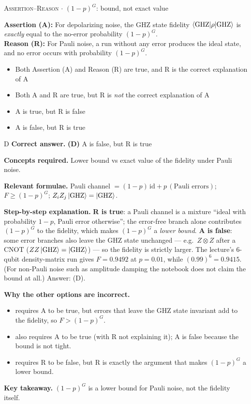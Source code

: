 \documentclass[11pt,a4paper]{article}
\newcommand{\optlabel}[1]{\textbf{(#1)}}
\newcommand{\correctlabel}[1]{\textcolor{okgreen}{\textbf{(#1)}\,\ding{51}}}
\newenvironment{qitem}[1]{\begin{list}{}{\setlength{\leftmargin}{3.3em}\setlength{\labelwidth}{3.1em}%
  \setlength{\labelsep}{0.2em}\setlength{\topsep}{3pt}\setlength{\parsep}{3pt}}\item[\textbf{Q.#1}\hfill]}{\end{list}}
\newcommand{\qsep}{\par\vspace{2pt}{\color{black!15}\hrule}\vspace{4pt}}
\newcommand{\qmeta}[2]{{\footnotesize\color{black!60}\textsc{#1} \;$\cdot$\; #2}\par}
\begin{document}
\begin{qitem}{57}
\qmeta{Assertion--Reason}{$(1-p)^G$: bound, not exact value}
\textbf{Assertion (A):} For depolarizing noise, the GHZ state fidelity $\braket{\mathrm{GHZ}|\rho|\mathrm{GHZ}}$ is \emph{exactly} equal to the
no-error probability $(1 - p)^G$.\\[1mm]
\textbf{Reason (R):} For Pauli noise, a run without any error produces the ideal state, and no error occurs with probability $(1 - p)^G$.
\begin{itemize}[leftmargin=2.6em, labelsep=0.4em, itemsep=2pt, topsep=3pt]
\item[\optlabel{A}] Both Assertion (A) and Reason (R) are true, and R is the correct explanation of A
\item[\optlabel{B}] Both A and R are true, but R is \emph{not} the correct explanation of A
\item[\optlabel{C}] A is true, but R is false
\item[\correctlabel{D}] A is false, but R is true
\end{itemize}
\end{qitem}
\begin{solbox}{D}
\textbf{\color{brand}Correct answer.} \textcolor{okgreen}{\textbf{(D)}} A is false, but R is true

\textbf{\color{brand}Concepts required.} Lower bound vs exact value of the fidelity under Pauli noise.

\textbf{\color{brand}Relevant formulae.} Pauli channel $= (1-p)\,\mathrm{id} + p\,(\text{Pauli errors})$; $F \ge (1-p)^G$; $Z_iZ_j\ket{\mathrm{GHZ}} = \ket{\mathrm{GHZ}}$.

\textbf{\color{brand}Step-by-step explanation.} \textbf{R is true}: a Pauli channel is a mixture ``ideal with probability $1 - p$, Pauli error otherwise''; the error-free branch alone contributes
$(1-p)^G$ to the fidelity, which makes $(1-p)^G$ a \emph{lower bound}. \textbf{A is false}: some error branches also leave the GHZ state unchanged ---
e.g.\ $Z\otimes Z$ after a CNOT ($ZZ\ket{\mathrm{GHZ}} = \ket{\mathrm{GHZ}}$) --- so the fidelity is strictly larger. The lecture's 6-qubit density-matrix run gives
$F = 0.9492$ at $p = 0.01$, while $(0.99)^6 = 0.9415$. (For non-Pauli noise such as amplitude damping the notebook does not claim the bound at all.) Answer: (D).

\textbf{\color{brand}Why the other options are incorrect.}
\begin{itemize}[leftmargin=2.4em, itemsep=1pt, topsep=2pt]
\item[\textbf{(A)}] requires A to be true, but errors that leave the GHZ state invariant add to the fidelity, so $F > (1-p)^G$.
\item[\textbf{(B)}] also requires A to be true (with R not explaining it); A is false because the bound is not tight.
\item[\textbf{(C)}] requires R to be false, but R is exactly the argument that makes $(1-p)^G$ a lower bound.
\end{itemize}
\textbf{\color{brand}Key takeaway.} $(1-p)^G$ is a lower bound for Pauli noise, not the fidelity itself.
\end{solbox}
\qsep
\end{document}
